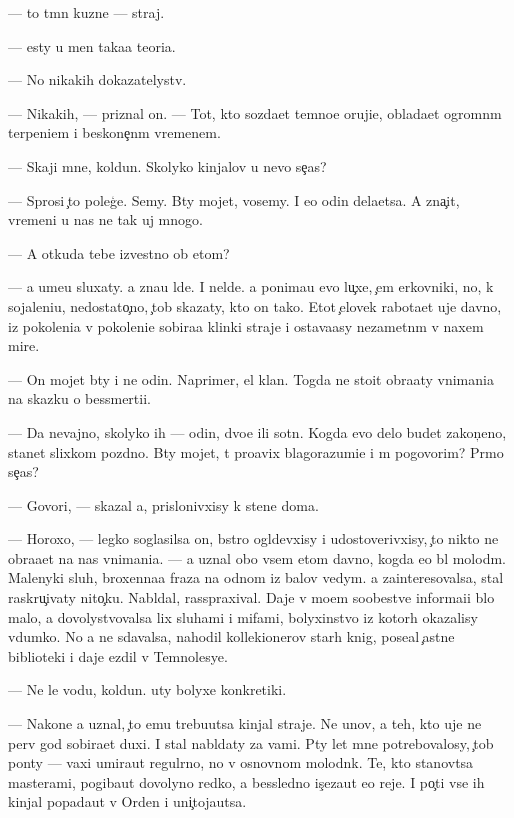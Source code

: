 \documentclass[10pt]{book}
\begin{document}
— {\C}to t{\e}mn{\yi}{\y} kuzne{\q} — straj.

— {\Y}esty u men{\ia} taka{\y}a teori{\y}a.

— No nikakih dokazatelystv.

— Nikakih, — priznal on. — Tot, kto sozda{\y}et temno{\y}e oruji{\y}e, oblada{\y}et ogromn{\yi}m terpeni{\y}em i beskone{\c}n{\yi}m vremenem.

— Skaji mne, koldun. Skolyko kinjalov u nevo se{\y}{\c}as?

— Sprosi {\c}to poleg{\c}e. Semy. B{\yi}ty mojet, vosemy. I {\y}e{\x}o odin dela{\y}etsa. A zna{\c}it, vremeni u nas ne tak uj mnogo.

— A otkuda tebe izvestno ob etom?

— {\Y}a ume{\y}u sluxaty. {\Y}a zna{\y}u l{\iu}de{\y}. I nel{\iu}de{\y}. {\Y}a ponima{\y}u {\y}evo lu{\c}xe, {\c}em {\q}erkovniki, no, k sojaleni{\y}u, nedostato{\c}no, {\c}tob{\yi} skazaty, kto on tako{\y}. Etot {\c}elovek rabota{\y}et uje davno, iz pokoleni{\y}a v pokoleni{\y}e sobira{\y}a klinki straje{\y} i ostava{\y}asy nezametn{\yi}m v naxem mire.

— On mojet b{\yi}ty i ne odin. Naprimer, {\q}el{\yi}{\y} klan. Togda ne sto{\y}it obra{\x}aty vnimani{\y}a na skazku o bessmerti{\y}i.

— Da nevajno, skolyko ih — odin, dvo{\y}e ili sotn{\ia}. Kogda {\y}evo delo budet zakon{\c}eno, stanet slixkom pozdno. B{\yi}ty mojet, t{\yi} pro{\y}avix blagorazumi{\y}e i m{\yi} pogovorim? Pr{\ia}mo se{\y}{\c}as?

— Govori, — skazal {\y}a, prislonivxisy k stene doma.

— Horoxo, — legko soglasilsa on, b{\yi}stro ogl{\ia}devxisy i udostoverivxisy, {\c}to nikto ne obra{\x}a{\y}et na nas vnimani{\y}a. — {\Y}a uznal obo vsem etom davno, kogda {\y}e{\x}o b{\yi}l molod{\yi}m. Malenyki{\y} sluh, broxenna{\y}a fraza na odnom iz balov vedym. {\Y}a za{\y}interesovalsa, stal raskru{\c}ivaty nito{\c}ku. Nabl{\iu}dal, rasspraxival. Daje v mo{\y}em soob{\x}estve informa{\q}i{\y}i b{\yi}lo malo, {\y}a dovolystvovalsa lix sluhami i mifami, bolyxinstvo iz kotor{\yi}h okazalisy v{\yi}dumko{\y}. No {\y}a ne sdavalsa, nahodil kollek{\q}ionerov star{\yi}h knig, pose{\x}al {\c}astn{\yi}{\y}e biblioteki i daje {\y}ezdil v Temnolesye.

— Ne le{\y} vodu, koldun. {\C}uty bolyxe konkretiki.

— Nakone{\q} {\y}a uznal, {\c}to {\y}emu trebu{\y}utsa kinjal{\yi} straje{\y}. Ne {\y}un{\q}ov, a teh, kto uje ne perv{\yi}{\y} god sobira{\y}et duxi. I stal nabl{\iu}daty za vami. P{\ia}ty let mne potrebovalosy, {\c}tob{\yi} pon{\ia}ty — vaxi umira{\y}ut regul{\ia}rno, no v osnovnom molodn{\ia}k. Te, kto stanov{\ia}tsa masterami, pogiba{\y}ut dovolyno redko, a bessledno is{\c}eza{\y}ut {\y}e{\x}o reje. I po{\c}ti vse ih kinjal{\yi} popada{\y}ut v Orden i uni{\c}toja{\y}utsa.
\end{document}
